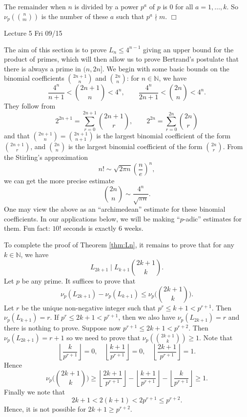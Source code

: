 \documentclass{article}
\def\N{{\mathbb N}}
\newenvironment{proof}{\noindent {\bf Proof:}}{$\Box$ \vspace{2 ex}}
\newcommand{\add}[1]{{\color{blue} #1}}
\begin{document}
\begin{proof}
    The remainder when $n$ is divided by a power $p^a$ of $p$ is $0$ for all $a = 1,\ldots,k$. So $\nu_p\left(\binom{n}{m}\right)$ is the number of these $a$ such that $p^a\nmid m$.
\end{proof}


\begin{center}
    \add{Lecture 5 Fri 09/15}
\end{center}
The aim of this section is to prove $L_n \leq 4^{n-1}$ giving an upper bound for the product of primes, which will then allow us to prove Bertrand's postulate that there is always a prime in $(n, 2n]$. We begin with some basic bounds on the binomial coefficients $\binom{2n+1}{n}$ and $\binom{2n}{n}$: for $n\in\N$, we have
$$\frac{4^n}{n+1} < \binom{2n+1}{n} < 4^n,\qquad \frac{4^n}{2n+1} < \binom{2n}{n}< 4^n.$$
They follow from $$2^{2n+1} = \sum_{r=0}^{2n+1}\binom{2n+1}{r},\qquad 2^{2n} = \sum_{r=0}^{2n}\binom{2n}{r}$$
and that $\binom{2n+1}{n} = \binom{2n+1}{n+1}$ is the largest binomial coefficient of the form $\binom{2n+1}{r}$, and $\binom{2n}{n}$ is the largest binomial coefficient of the form $\binom{2n}{r}$. From the Stirling's approximation
$$n!\sim \sqrt{2\pi n}\left(\frac{n}{e}\right)^n,$$
we can get the more precise estimate $$\binom{2n}{n}\sim \frac{4^n}{\sqrt{\pi n}}.$$
One may view the above as an ``archimedean'' estimate for these binomial coefficients. In our applications below, we will be making ``$p$-adic'' estimates for them. Fun fact: $10!$ seconds is exactly $6$ weeks.

To complete the proof of Theorem \ref{thm:Ln}, it remains to prove that for any $k\in\N$, we have $$L_{2k+1}\mid L_{k+1}\binom{2k+1}{k}.$$
Let $p$ be any prime. It suffices to prove that $$\nu_p(L_{2k+1})-\nu_p(L_{k+1})\leq\nu_p\Big(\binom{2k+1}{k}\Big).$$
    Let $r$ be the unique non-negative integer such that $p^r \leq k+1 < p^{r+1}$. Then $\nu_p(L_{k+1}) = r$. If $p^r \leq 2k+1 < p^{r+1}$, then we also have $\nu_p(L_{2k+1}) = r$ and there is nothing to prove. Suppose now $p^{r+1}\leq 2k+1 < p^{r+2}$. Then $\nu_p(L_{2k+1}) = r+1$ so we need to prove that $\nu_p(\binom{2k+1}{k})\geq 1$. Note that
    $$\left\lfloor\frac{k}{p^{r+1}}\right\rfloor=0,\quad \left\lfloor\frac{k+1}{p^{r+1}}\right\rfloor=0,\quad\left\lfloor\frac{2k+1}{p^{r+1}}\right\rfloor=1.$$
    Hence 
    $$\nu_p\Big(\binom{2k+1}{k}\Big) \geq \left\lfloor\frac{2k+1}{p^{r+1}}\right\rfloor - \left\lfloor\frac{k+1}{p^{r+1}}\right\rfloor - \left\lfloor\frac{k}{p^{r+1}}\right\rfloor\geq 1.$$
    Finally we note that
    $$2k + 1 < 2(k+1) < 2p^{r+1}\leq p^{r+2}.$$
    Hence, it is not possible for $2k+1\geq p^{r+2}$.
\end{document}
